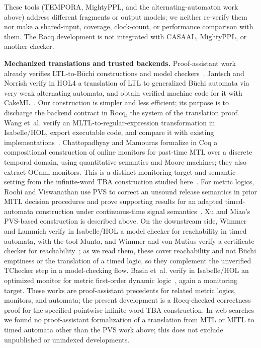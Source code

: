 \documentclass[manuscript]{acmart}
\newcommand{\runinhead}[1]{\par\noindent\textbf{#1}\enspace}
\begin{document}
These tools (TEMPORA, MightyPPL, and the alternating-automaton work above)
address different fragments or output models; we neither re-verify
them nor make a shared-input, coverage, clock-count, or performance
comparison with them. The Rocq development is not integrated with CASAAL,
MightyPPL, or another checker.

\runinhead{Mechanized translations and trusted backends.}
Proof-assistant work already verifies LTL-to-B\"uchi constructions and model
checkers~\cite{schimpf_tphols09,cava_cav13,ltl_to_gba_afp,
seidl_sickert_afp19}. Jantsch and Norrish verify in HOL4 a translation of LTL to
generalized B\"uchi automata via very weak alternating automata, and obtain
verified machine code for it with CakeML~\cite{jantsch_norrish_itp18}. Our construction is
simpler and less efficient; its purpose is to discharge the backend contract in
Rocq, the system of the translation proof. Wang et~al. verify an MLTL-to-regular-expression
transformation in Isabelle/HOL, export executable code, and compare it with
existing implementations~\cite{wang_mltl_tacas25}. Chattopadhyay and
Mamouras formalize in Coq a compositional construction of online monitors for
past-time MTL over a discrete temporal domain, using quantitative semantics
and Moore machines; they also extract OCaml monitors. This is a distinct
monitoring target and semantic setting from the infinite-word TBA construction
studied here~\cite{chattopadhyay_mamouras_rv20}. For metric logics, Roohi
and Viswanathan use PVS to correct an unsound release semantics in prior MITL
decision procedures and prove supporting results for an adapted
timed-automata construction under continuous-time signal semantics~\cite{roohi_viswanathan_vmcai18}. Xu and Miao's PVS-based construction is
described above. On the downstream side, Wimmer and Lammich verify in
Isabelle/HOL a model checker for reachability in timed automata, with the tool
Munta, and Wimmer and von Mutius verify a certificate checker for reachability~\cite{munta_tacas18,munta_formats19,wimmer_vonmutius_tacas20}; as we read
them, these cover reachability and not B\"uchi emptiness or the translation of a
timed logic, so they complement the unverified TChecker step in a model-checking flow. Basin et~al. verify in Isabelle/HOL an optimized
monitor for metric first-order dynamic logic~\cite{basin_verimon_ijcar20}, again
a monitoring target. These works are proof-assistant
precedents for related metric logics, monitors, and automata; the present
development is a Rocq-checked correctness proof for the specified pointwise
infinite-word TBA construction. In web searches we found no proof-assistant
formalization of a translation from MTL or MITL to timed automata other than
the PVS work above; this does not exclude unpublished or unindexed
developments.
\end{document}
